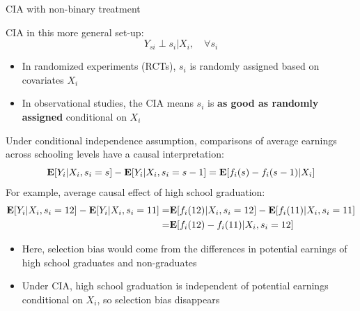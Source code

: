 \documentclass[compress, 8pt]{beamer}
\begin{document}
\begin{frame}{CIA with non-binary treatment}

CIA in this more general set-up:
\begin{equation*}
    Y_{si} \perp s_i \vert X_i, \quad \forall s_i
\end{equation*}
\begin{itemize}
    \item In randomized experiments (RCTs), $s_i$ is randomly assigned based on covariates $X_i$
    \item In observational studies, the CIA means $s_i$ is \textbf{as good as randomly assigned} conditional on $X_i$
\end{itemize}
Under conditional independence assumption, comparisons of average earnings across schooling levels have a causal interpretation:
\begin{equation*}
    \mathbf{E} [Y_i \vert X_i, s_i = s] - \mathbf{E}[Y_i \vert X_i, s_i = s - 1] = \mathbf{E} [f_i(s) - f_i(s - 1) \vert X_i]
\end{equation*}
For example, average causal effect of high school graduation:
\begin{align*}
    \mathbf{E} [Y_i \vert X_i, s_i = 12] - \mathbf{E}[Y_i \vert X_i, s_i = 11] =& \mathbf{E} [f_i (12) \vert X_i, s_i = 12] - \mathbf{E} [f_i (11) \vert X_i, s_i = 11] \\
    =& \mathbf{E} [f_i(12) - f_i(11) \vert X_i, s_i = 12] 
\end{align*}
\begin{itemize}
    \item Here, selection bias would come from the differences in potential earnings of high school graduates and non-graduates
    \item Under CIA, high school graduation is independent of potential earnings conditional on $X_i$, so selection bias disappears
\end{itemize}

\end{frame}



\end{document}
